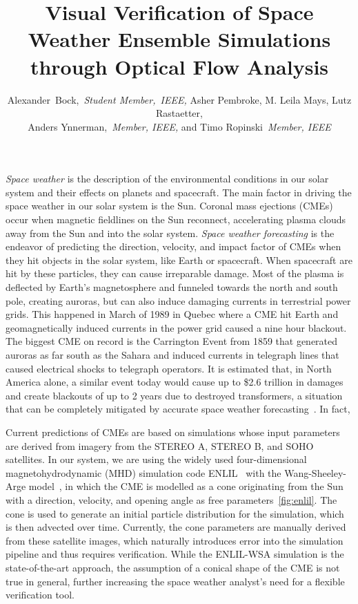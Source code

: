 \documentclass[journal]{vgtc}                %
\title{Visual Verification of Space Weather Ensemble Simulations through Optical Flow Analysis}
\author{
    Alexander~Bock,~\textit{Student Member,~IEEE,}
    Asher Pembroke,
    M. Leila Mays,
    Lutz Rastaetter,\\%
    Anders Ynnerman,~\textit{Member, IEEE,}
    and Timo Ropinski~\textit{Member, IEEE}%
}
\begin{document}
\maketitle
\emph{Space weather} is the description of the environmental conditions in our solar system and their effects on planets and spacecraft. The main factor in driving the space weather in our solar system is the Sun. Coronal mass ejections (CMEs) occur when magnetic fieldlines on the Sun reconnect, accelerating plasma clouds away from the Sun and into the solar system. \emph{Space weather forecasting} is the endeavor of predicting the direction, velocity, and impact factor of CMEs when they hit objects in the solar system, like Earth or spacecraft. When spacecraft are hit by these particles, they can cause irreparable damage. Most of the plasma is deflected by Earth's magnetosphere and funneled towards the north and south pole, creating auroras, but can also induce damaging currents in terrestrial power grids. This happened in March of 1989 in Quebec where a CME hit Earth and geomagnetically induced currents in the power grid caused a nine hour blackout. The biggest CME on record is the Carrington Event from 1859 that generated auroras as far south as the Sahara and induced currents in telegraph lines that caused electrical shocks to telegraph operators. It is estimated that, in North America alone, a similar event today would cause up to \$2.6 trillion in damages and create blackouts of up to 2 years due to destroyed transformers, a situation that can be completely mitigated by accurate space weather forecasting~\cite{lloyds2013impact}. In fact,\cite{baker2013major}

Current predictions of CMEs are based on simulations whose input parameters are derived from imagery from the STEREO A, STEREO B, and SOHO satellites. In our system, we are using the widely used four-dimensional magnetohydrodynamic (MHD) simulation code ENLIL~\cite{odstrcil2003modeling} with the Wang-Sheeley-Arge model~\cite{parsons2011wang}, in which the CME is modelled as a cone originating from the Sun with a direction, velocity, and opening angle as free parameters~\ref{fig:enlil}. The cone is used to generate an initial particle distribution for the simulation, which is then advected over time. Currently, the cone parameters are manually derived from these satellite images, which naturally introduces error into the simulation pipeline and thus requires verification. While the ENLIL-WSA simulation is the state-of-the-art approach, the assumption of a conical shape of the CME is not true in general, further increasing the space weather analyst's need for a flexible verification tool.
\end{document}
